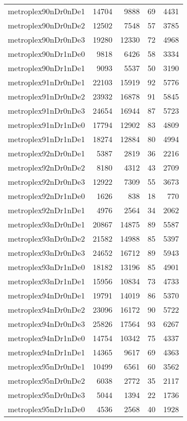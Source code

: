 \begin{longtable}{lrrrr}
metroplex90nDr0nDe1 & 14704 & 9888 & 69 & 4431 \\
metroplex90nDr0nDe2 & 12502 & 7548 & 57 & 3785 \\
metroplex90nDr0nDe3 & 19280 & 12330 & 72 & 4968 \\
metroplex90nDr1nDe0 & 9818 & 6426 & 58 & 3334 \\
metroplex90nDr1nDe1 & 9093 & 5537 & 50 & 3190 \\
metroplex91nDr0nDe1 & 22103 & 15919 & 92 & 5776 \\
metroplex91nDr0nDe2 & 23932 & 16878 & 91 & 5845 \\
metroplex91nDr0nDe3 & 24654 & 16944 & 87 & 5723 \\
metroplex91nDr1nDe0 & 17794 & 12902 & 83 & 4809 \\
metroplex91nDr1nDe1 & 18274 & 12884 & 80 & 4994 \\
metroplex92nDr0nDe1 & 5387 & 2819 & 36 & 2216 \\
metroplex92nDr0nDe2 & 8180 & 4312 & 43 & 2709 \\
metroplex92nDr0nDe3 & 12922 & 7309 & 55 & 3673 \\
metroplex92nDr1nDe0 & 1626 & 838 & 18 & 770 \\
metroplex92nDr1nDe1 & 4976 & 2564 & 34 & 2062 \\
metroplex93nDr0nDe1 & 20867 & 14875 & 89 & 5587 \\
metroplex93nDr0nDe2 & 21582 & 14988 & 85 & 5397 \\
metroplex93nDr0nDe3 & 24652 & 16712 & 89 & 5943 \\
metroplex93nDr1nDe0 & 18182 & 13196 & 85 & 4901 \\
metroplex93nDr1nDe1 & 15956 & 10834 & 73 & 4733 \\
metroplex94nDr0nDe1 & 19791 & 14019 & 86 & 5370 \\
metroplex94nDr0nDe2 & 23096 & 16172 & 90 & 5722 \\
metroplex94nDr0nDe3 & 25826 & 17564 & 93 & 6267 \\
metroplex94nDr1nDe0 & 14754 & 10342 & 75 & 4337 \\
metroplex94nDr1nDe1 & 14365 & 9617 & 69 & 4363 \\
metroplex95nDr0nDe1 & 10499 & 6561 & 60 & 3562 \\
metroplex95nDr0nDe2 & 6038 & 2772 & 35 & 2117 \\
metroplex95nDr0nDe3 & 5044 & 1394 & 22 & 1736 \\
metroplex95nDr1nDe0 & 4536 & 2568 & 40 & 1928 \\

\end{longtable}
